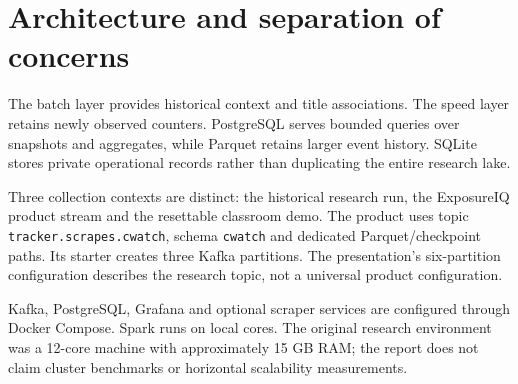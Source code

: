 \documentclass[11pt,a4paper]{article}
\newcommand{\code}[1]{{\small\nolinkurl{#1}}}
\newcommand{\chapterpage}[1]{\clearpage\section{#1}}
\begin{document}
\chapterpage{Architecture and separation of concerns}
\begin{center}
\end{center}

The batch layer provides historical context and title associations.
The speed layer retains newly observed counters. PostgreSQL serves bounded
queries over snapshots and aggregates, while Parquet retains larger event
history. SQLite stores private operational records rather than duplicating
the entire research lake.

Three collection contexts are distinct: the historical research run,
the ExposureIQ product stream and the resettable classroom demo.
The product uses topic \code{tracker.scrapes.cwatch}, schema
\code{cwatch} and dedicated Parquet/checkpoint paths. Its starter creates
three Kafka partitions. The presentation's six-partition configuration
describes the research topic, not a universal product configuration.

Kafka, PostgreSQL, Grafana and optional scraper services are configured
through Docker Compose. Spark runs on local cores. The original research
environment was a 12-core machine with approximately 15 GB RAM; the report
does not claim cluster benchmarks or horizontal scalability measurements.
\end{document}
